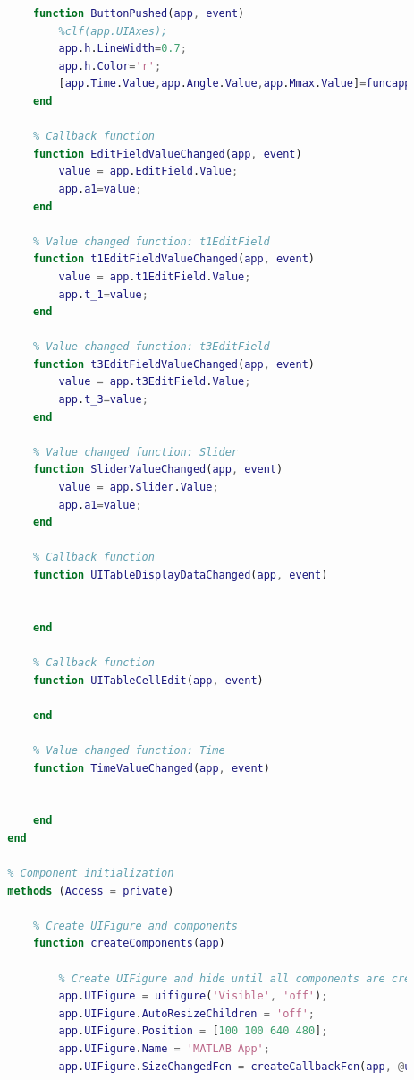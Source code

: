 \documentclass[withoutpreface,bwprint]{cumcmthesis} %
\begin{document}
\begin{appendices}
\begin{lstlisting}[language=matlab]
            % Callback function: Angle, Button, Mmax
            function ButtonPushed(app, event)
                %clf(app.UIAxes);
                app.h.LineWidth=0.7;
                app.h.Color='r';
                [app.Time.Value,app.Angle.Value,app.Mmax.Value]=funcapp(app.a1,app.t_1,app.t_3,app.h);
            end
    
            % Callback function
            function EditFieldValueChanged(app, event)
                value = app.EditField.Value;
                app.a1=value;
            end
    
            % Value changed function: t1EditField
            function t1EditFieldValueChanged(app, event)
                value = app.t1EditField.Value;
                app.t_1=value;
            end
    
            % Value changed function: t3EditField
            function t3EditFieldValueChanged(app, event)
                value = app.t3EditField.Value;
                app.t_3=value;
            end
    
            % Value changed function: Slider
            function SliderValueChanged(app, event)
                value = app.Slider.Value;
                app.a1=value;
            end
    
            % Callback function
            function UITableDisplayDataChanged(app, event)
          
                
            end
    
            % Callback function
            function UITableCellEdit(app, event)
                
            end
    
            % Value changed function: Time
            function TimeValueChanged(app, event)
    
                
            end
        end
    
        % Component initialization
        methods (Access = private)
    
            % Create UIFigure and components
            function createComponents(app)
    
                % Create UIFigure and hide until all components are created
                app.UIFigure = uifigure('Visible', 'off');
                app.UIFigure.AutoResizeChildren = 'off';
                app.UIFigure.Position = [100 100 640 480];
                app.UIFigure.Name = 'MATLAB App';
                app.UIFigure.SizeChangedFcn = createCallbackFcn(app, @updateAppLayout, true);
    

\end{lstlisting}
\end{appendices}
\end{document}
